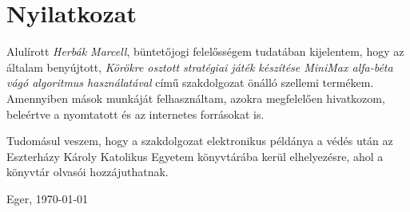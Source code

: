 \documentclass{thesis-ekf}
\begin{document}
\chapter*{Nyilatkozat}

Alulírott \emph{Herbák Marcell}, büntetőjogi felelősségem tudatában kijelentem, hogy az általam benyújtott, \emph{Körökre osztott stratégiai játék készítése MiniMax alfa-béta vágó algoritmus használatával} című szakdolgozat önálló szellemi termékem. Amennyiben mások munkáját felhasználtam, azokra megfelelően hivatkozom, beleértve a nyomtatott és az internetes forrásokat is.

Tudomásul veszem, hogy a szakdolgozat elektronikus példánya a védés után az Eszterházy Károly Katolikus Egyetem könyvtárába kerül elhelyezésre, ahol a könyvtár olvasói hozzájuthatnak.

\bigskip
\begin{flushleft}
Eger, \today
\end{flushleft}

\medskip
\begin{flushright}
\end{flushright}

%
\end{document}
